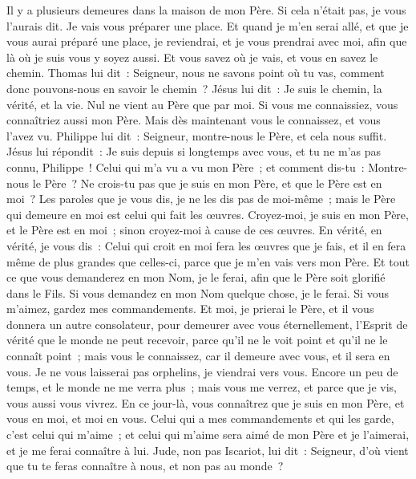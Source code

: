 \begin{multicols}{2}
Il y a plusieurs demeures dans la maison de mon Père. Si cela n'était pas, je vous l'aurais dit. Je vais vous préparer une place.
Et quand je m'en serai allé, et que je vous aurai préparé une place, je reviendrai, et je vous prendrai avec moi, afin que là où je suis vous y soyez aussi.
Et vous savez où je vais, et vous en savez le chemin.
Thomas lui dit~: Seigneur, nous ne savons point où tu vas, comment donc pouvons-nous en savoir le chemin~?
Jésus lui dit~: Je suis le chemin, la vérité, et la vie. Nul ne vient au Père que par moi.
Si vous me connaissiez, vous connaîtriez aussi mon Père. Mais dès maintenant vous le connaissez, et vous l'avez vu.
Philippe lui dit~: Seigneur, montre-nous le Père, et cela nous suffit.
Jésus lui répondit~: Je suis depuis si longtemps avec vous, et tu ne m'as pas connu, Philippe~! Celui qui m'a vu a vu mon Père~; et comment dis-tu~: Montre-nous le Père~?
Ne crois-tu pas que je suis en mon Père, et que le Père est en moi~? Les paroles que je vous dis, je ne les dis pas de moi-même~; mais le Père qui demeure en moi est celui qui fait les œuvres.
Croyez-moi, je suis en mon Père, et le Père est en moi~; sinon croyez-moi à cause de ces œuvres.
En vérité, en vérité, je vous dis~: Celui qui croit en moi fera les œuvres que je fais, et il en fera même de plus grandes que celles-ci, parce que je m'en vais vers mon Père.
Et tout ce que vous demanderez en mon Nom, je le ferai, afin que le Père soit glorifié dans le Fils.
Si vous demandez en mon Nom quelque chose, je le ferai.
Si vous m'aimez, gardez mes commandements.
Et moi, je prierai le Père, et il vous donnera un autre consolateur, pour demeurer avec vous éternellement,
l'Esprit de vérité que le monde ne peut recevoir, parce qu'il ne le voit point et qu'il ne le connaît point~; mais vous le connaissez, car il demeure avec vous, et il sera en vous.
Je ne vous laisserai pas orphelins, je viendrai vers vous.
Encore un peu de temps, et le monde ne me verra plus~; mais vous me verrez, et parce que je vis, vous aussi vous vivrez.
En ce jour-là, vous connaîtrez que je suis en mon Père, et vous en moi, et moi en vous.
Celui qui a mes commandements et qui les garde, c'est celui qui m'aime~; et celui qui m'aime sera aimé de mon Père et je l'aimerai, et je me ferai connaître à lui.
Jude, non pas Iscariot, lui dit~: Seigneur, d'où vient que tu te feras connaître à nous, et non pas au monde~?

\end{multicols}

